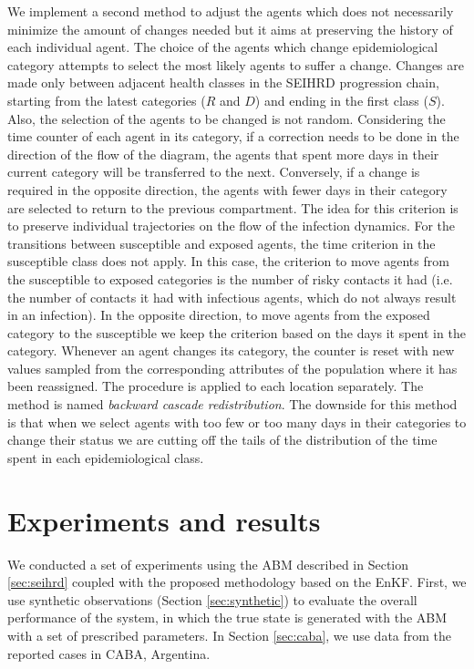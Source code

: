 \documentclass[11pt,a4paper]{article}
\begin{document}
We implement a second method to adjust the agents which does not necessarily minimize the amount of changes needed but it aims at preserving the history of each individual agent. The choice of the agents which change epidemiological category attempts to select the most likely agents to suffer a change. Changes are made only between adjacent health classes in the SEIHRD progression chain, starting from the latest categories ($R$ and $D$) and ending in the first class ($S$). Also, the selection of the agents to be changed is not random. Considering the time counter of each agent in its category, if a correction needs to be done in the direction of the flow of the diagram, the agents that spent more days in their current category will be transferred to the next. Conversely, if a change is required in the opposite direction, the agents with fewer days in their category are selected to return to the previous compartment. The idea for this criterion is to preserve individual trajectories on the flow of the infection dynamics. For the transitions between susceptible and exposed agents, the time criterion in the susceptible class does not apply. In this case, the criterion to move agents from the susceptible to exposed categories is the number of risky contacts it had (i.e. the number of contacts it had with infectious agents, which do not always result in an infection). In the opposite direction, to move agents from the exposed category to the susceptible we keep the criterion based on the days it spent in the category. Whenever an agent changes its category, the  counter is reset with new values sampled from the corresponding attributes of the population where it has been reassigned. The procedure is applied to each location separately. The method is named \textit{backward cascade redistribution}. The downside for this method is that when we select agents with too few or too many days in their categories to change their status we are cutting off the tails of the distribution of the time spent in each epidemiological class.

\section{Experiments and results}

We conducted a set of experiments using the ABM described in Section \ref{sec:seihrd} coupled with the proposed methodology based on the EnKF. First, we use synthetic observations (Section \ref{sec:synthetic}) to evaluate the overall performance of the system, in which the true state is generated with the ABM with a set of prescribed parameters. In Section \ref{sec:caba}, we use data from the reported cases in CABA, Argentina.
\end{document}
